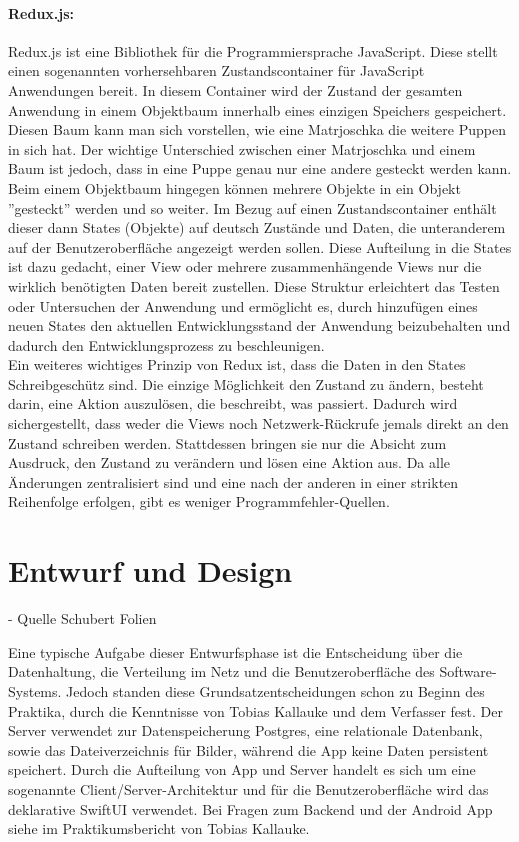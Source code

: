 \documentclass[nomenclature, oneside, 150]{HSMW-Thesis}
\begin{document}
		\paragraph{Redux.js:}
			Redux.js ist eine Bibliothek für die Programmiersprache JavaScript. Diese stellt einen sogenannten vorhersehbaren Zustandscontainer für JavaScript Anwendungen bereit. In diesem Container wird der Zustand der gesamten Anwendung in einem Objektbaum innerhalb eines einzigen Speichers gespeichert. Diesen Baum kann man sich vorstellen, wie eine Matrjoschka die weitere Puppen in sich hat. Der wichtige Unterschied zwischen einer Matrjoschka und einem Baum ist jedoch, dass in eine Puppe genau nur eine andere gesteckt werden kann. Beim einem Objektbaum hingegen können mehrere Objekte in ein Objekt ''gesteckt'' werden und so weiter. Im Bezug auf einen Zustandscontainer enthält dieser dann States (Objekte) auf deutsch Zustände und Daten, die unteranderem auf der Benutzeroberfläche angezeigt werden sollen. Diese Aufteilung in die States ist dazu gedacht, einer View oder mehrere zusammenhängende Views nur die wirklich benötigten Daten bereit zustellen. Diese Struktur erleichtert das Testen oder Untersuchen der Anwendung und ermöglicht es, durch hinzufügen eines neuen States den aktuellen Entwicklungsstand der Anwendung beizubehalten und dadurch den Entwicklungsprozess zu beschleunigen. \\
			Ein weiteres wichtiges Prinzip von Redux ist, dass die Daten in den States Schreibgeschütz sind. Die einzige Möglichkeit den Zustand zu ändern, besteht darin, eine Aktion auszulösen, die beschreibt, was passiert. Dadurch wird sichergestellt, dass weder die Views noch Netzwerk-Rückrufe jemals direkt an den Zustand schreiben werden. Stattdessen bringen sie nur die Absicht zum Ausdruck, den Zustand zu verändern und lösen eine Aktion aus. Da alle Änderungen zentralisiert sind und eine nach der anderen in einer strikten Reihenfolge erfolgen, gibt es weniger Programmfehler-Quellen.

	\section{Entwurf und Design}

		- Quelle Schubert Folien
		
		Eine typische Aufgabe dieser Entwurfsphase ist die Entscheidung über die Datenhaltung, die Verteilung im Netz und die Benutzeroberfläche des Software-Systems. Jedoch standen diese Grundsatzentscheidungen schon zu Beginn des Praktika, durch die Kenntnisse von Tobias Kallauke und dem Verfasser fest. Der Server verwendet zur Datenspeicherung Postgres, eine relationale Datenbank, sowie das Dateiverzeichnis für Bilder, während die App keine Daten persistent speichert. Durch die Aufteilung von App und Server handelt es sich um eine sogenannte Client/Server-Architektur und für die Benutzeroberfläche wird das deklarative SwiftUI verwendet. Bei Fragen zum Backend und der Android App siehe im Praktikumsbericht von Tobias Kallauke.
		
\end{document}
